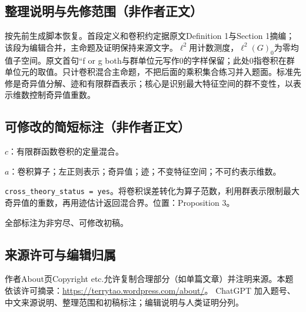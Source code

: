 \documentclass[UTF8,11pt]{ctexart}
\theoremstyle{definition}
\begin{document}
\subsection*{整理说明与先修范围（非作者正文）}
按先前生成脚本恢复。首段定义和卷积约定据原文Definition 1与Section 1摘编；该段为编辑合并，主命题及证明保持来源文字。$\ell^2$用计数测度，$\ell^2(G)_0$为零均值子空间。原文首句``f or g both与群单位元写作0的字样保留；此处0指卷积在群单位元的取值。只计卷积混合主命题，不把后面的乘积集合练习并入题面。标准先修是奇异值分解、迹和有限群酉表示；核心是识别最大特征空间的群不变性，以表示维数控制奇异值重数。
\subsection*{可修改的简短标注（非作者正文）}
$c$：有限群函数卷积的定量混合。

$a$：卷积算子；左正则表示；奇异值；迹；不变特征空间；不可约表示维数。

\texttt{cross\_theory\_status = yes}。将卷积误差转化为算子范数，利用群表示限制最大奇异值的重数，再用迹估计返回混合界。位置：Proposition 3。

全部标注为非穷尽、可修改初稿。
\subsection*{来源许可与编辑归属}
作者About页Copyright etc.允许复制合理部分（如单篇文章）并注明来源。本题依该许可摘录：\url{https://terrytao.wordpress.com/about/}。
ChatGPT 加入题号、中文来源说明、整理范围和初稿标注；编辑说明与人类证明分列。
\end{document}
